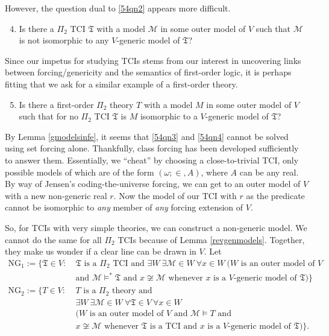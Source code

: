 \documentclass[12pt, twoside]{memoir}
\numberwithin{equation}{section}
\theoremstyle{definition}
\theoremstyle{remark}
\theoremstyle{definition}
\theoremstyle{definition}
\theoremstyle{definition}
\theoremstyle{remark}
\begin{document}
However, the question dual to \ref{54qn2} appears more difficult.

\begin{enumerate}[label=(Q\arabic*)]
    \setcounter{enumi}{3}
    \item\label{54qn3} Is there a $\Pi_2$ TCI $\mathfrak{T}$ with a model $\mathcal{M}$ in some outer model of $V$ such that $\mathcal{M}$ is not isomorphic to any $V$-generic model of $\mathfrak{T}$?
\end{enumerate}

Since our impetus for studying TCIs stems from our interest in uncovering links between forcing/genericity and the semantics of first-order logic, it is perhaps fitting that we ask for a similar example of a first-order theory. 

\begin{enumerate}[label=(Q\arabic*)]
    \setcounter{enumi}{4}
    \item\label{54qn4} Is there a first-order $\Pi_2$ theory $T$ with a model $M$ in some outer model of $V$ such that for no $\Pi_2$ TCI $\mathfrak{T}$ is $M$ isomorphic to a $V$-generic model of $\mathfrak{T}$?
\end{enumerate}

By Lemma \ref{gmodelsinfe}, it seems that \ref{54qn3} and \ref{54qn4} cannot be solved using set forcing alone. Thankfully, class forcing has been developed sufficiently to answer them. Essentially, we ``cheat'' by choosing a close-to-trivial TCI, only possible models of which are of the form $(\omega; \in, A)$, where $A$ can be any real. By way of Jensen's coding-the-universe forcing, we can get to an outer model of $V$ with a new non-generic real $r$. Now the model of our TCI with $r$ as the predicate cannot be isomorphic to \emph{any} member of \emph{any} forcing extension of $V$. 

So, for TCIs with very simple theories, we can construct a non-generic model. We cannot do the same for all $\Pi_2$ TCIs because of Lemma \ref{revgenmodels}. Together, they make us wonder if a clear line can be drawn in $V$. Let 
\begin{align*}
    \mathrm{NG}_1 := \{\mathfrak{T} \in V : \ & \mathfrak{T} \text{ is a } \Pi_2 \text{ TCI and } \exists W \ \exists \mathcal{M} \! \in \! W \ \forall x \! \in \! W \ (W \text{ is an outer model of } V \\
    & \text{and } \mathcal{M} \models^* \mathfrak{T} \text{ and } x \not\cong \mathcal{M} \text{ whenever } x \text{ is a } V \text{-generic model of } \mathfrak{T})\} \\
    \mathrm{NG}_2 := \{T \in V : \ & T \text{ is a } \Pi_2 \text{ theory and } \\
    & \exists W \ \exists \mathcal{M} \! \in \! W \ \forall \mathfrak{T} \! \in \! V \ \forall x \! \in \! W \\
    & (W \text{ is an outer model of } V \text{ and } \mathcal{M} \models T \text{ and } \\
    & x \not\cong \mathcal{M} \text{ whenever } \mathfrak{T} \text{ is a TCI and } x \text{ is a } V \text{-generic model of } \mathfrak{T})\} \text{.}
\end{align*}
\end{document}
